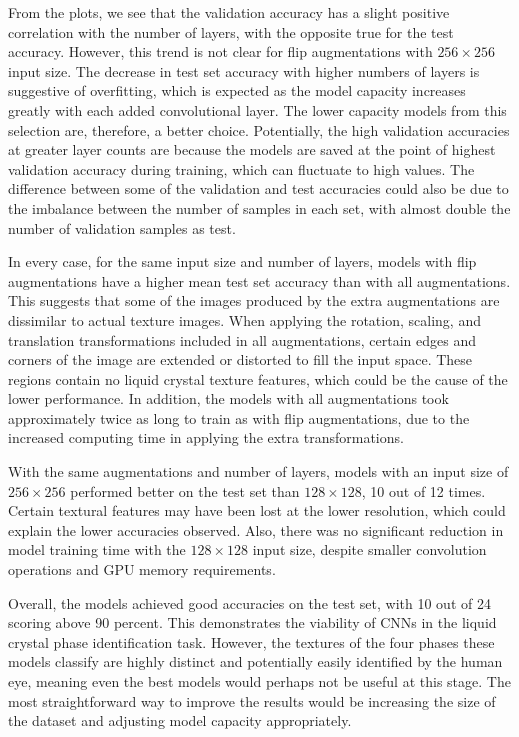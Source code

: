 \documentclass[12pt]{article}
\begin{document}
From the plots, we see that the validation accuracy has a slight positive correlation with the number of layers, with the opposite true for the test accuracy. However, this trend is not clear for flip augmentations with $256 \times 256$ input size. The decrease in test set accuracy with higher numbers of layers is suggestive of overfitting, which is expected as the model capacity increases greatly with each added convolutional layer. The lower capacity models from this selection are, therefore, a better choice. Potentially, the high validation accuracies at greater layer counts are because the models are saved at the point of highest validation accuracy during training, which can fluctuate to high values. The difference between some of the validation and test accuracies could also be due to the imbalance between the number of samples in each set, with almost double the number of validation samples as test.

In every case, for the same input size and number of layers, models with flip augmentations have a higher mean test set accuracy than with all augmentations. This suggests that some of the images produced by the extra augmentations are dissimilar to actual texture images. When applying the rotation, scaling, and translation transformations included in all augmentations, certain edges and corners of the image are extended or distorted to fill the input space. These regions contain no liquid crystal texture features, which could be the cause of the lower performance. In addition, the models with all augmentations took approximately twice as long to train as with flip augmentations, due to the increased computing time in applying the extra transformations.

With the same augmentations and number of layers, models with an input size of $256 \times 256$ performed better on the test set than $128 \times 128$, 10 out of 12 times. Certain textural features may have been lost at the lower resolution, which could explain the lower accuracies observed. Also, there was no significant reduction in model training time with the $128 \times 128$ input size, despite smaller convolution operations and GPU memory requirements.

Overall, the models achieved good accuracies on the test set, with 10 out of 24 scoring above 90 percent. This demonstrates the viability of CNNs in the liquid crystal phase identification task. However, the textures of the four phases these models classify are highly distinct and potentially easily identified by the human eye, meaning even the best models would perhaps not be useful at this stage. The most straightforward way to improve the results would be increasing the size of the dataset and adjusting model capacity appropriately.
\end{document}
